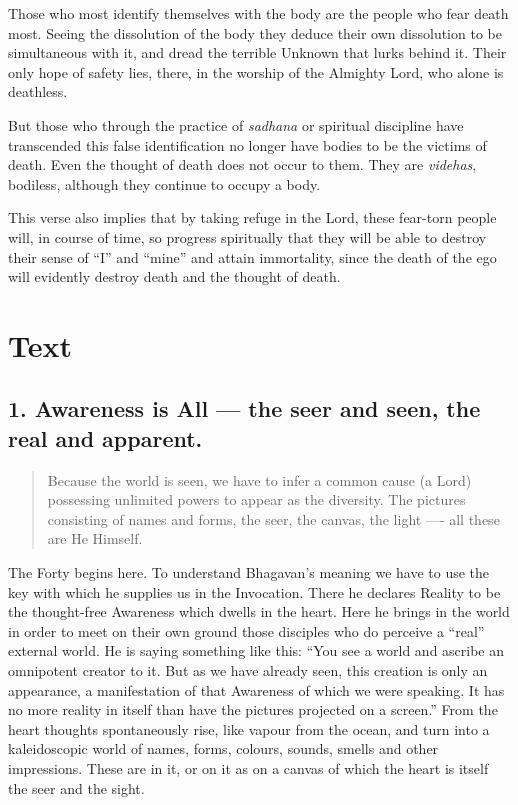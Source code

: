 \documentclass[12pt]{report}
\begin{document}
Those who most identify themselves with the body are the people who
fear death most. Seeing the dissolution of the body they deduce their
own dissolution to be simultaneous with it, and dread the terrible
Unknown that lurks behind it. Their only hope of safety lies, there,
in the worship of the Almighty Lord, who alone is deathless.

But those who through the practice of \emph{sadhana} or spiritual
discipline have transcended this false identification no longer have
bodies to be the victims of death. Even the thought of death does not
occur to them. They are \emph{videhas}, bodiless, although they
continue to occupy a body.

This verse also implies that by taking refuge in the Lord, these
fear-torn people will, in course of time, so progress spiritually that
they will be able to destroy their sense of ``I'' and ``mine'' and
attain immortality, since the death of the ego will evidently destroy
death and the thought of death.

\chapter{Text}


\section{1. Awareness is All --- the seer and seen, the real and apparent.}

\begin{quote}
  Because the world is seen, we have to infer a common cause (a Lord)
  possessing unlimited powers to appear as the diversity. The pictures
  consisting of names and forms, the seer, the canvas, the light ----
  all these are He Himself.
\end{quote}


The Forty begins here. To understand Bhagavan's meaning we have to use
the key with which he supplies us in the Invocation. There he declares
Reality to be the thought-free Awareness which dwells in the
heart. Here he brings in the world in order to meet on their own
ground those disciples who do perceive a ``real'' external world. He
is saying something like this: ``You see a world and ascribe an
omnipotent creator to it. But as we have already seen, this creation
is only an appearance, a manifestation of that Awareness of which we
were speaking. It has no more reality in itself than have the pictures
projected on a screen.'' From the heart thoughts spontaneously rise,
like vapour from the ocean, and turn into a kaleidoscopic world of
names, forms, colours, sounds, smells and other impressions. These are
in it, or on it as on a canvas of which the heart is itself the seer
and the sight.
\end{document}
